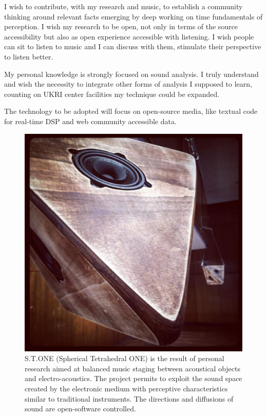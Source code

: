 \documentclass[
	a4paper,
	twocolumn
	]{article}
\begin{document}
I wish to contribute, with my research and music, to establish a community thinking around relevant facts emerging by deep working on time fundamentals of perception. I wish my research to be open, not only in terms of the source accessibility but also as open experience accessible with listening. I wish people can sit to listen to music and I can discuss with them, stimulate their perspective to listen better.

My personal knowledge is strongly focused on sound analysis. I truly understand and wish the necessity to integrate other forms of analysis I supposed to learn, counting on UKRI center facilities my technique could be expanded.

The technology to be adopted will focus on open-source media, like textual code for real-time DSP and web community accessible data.


\vfill\null

\begin{figure}[htbp]
\begin{center}
\includegraphics[width=.47\textwidth]{img/13556748_1807931906092757_1243460980_n.jpg}
\caption{S.T.ONE (Spherical Tetrahedral ONE) is the result of personal research aimed at balanced music staging between acoustical objects and electro-acoustics. The project permits to exploit the sound space created by the electronic medium with perceptive characteristics similar to traditional instruments. The directions and diffusions of sound are open-software controlled.}
\label{stone2}
\end{center}
\end{figure}
\end{document}
